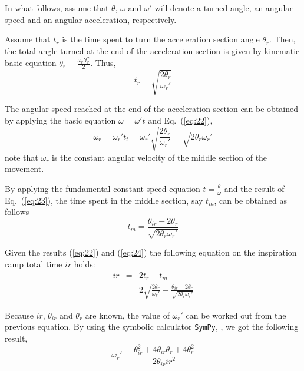 \documentclass[a4paper]{article}
\begin{document}
In what follows, assume that $\theta$, $\omega$ and $\omega'$ will
denote a turned angle, an angular speed and an angular acceleration,
respectively.




Assume that $t_r$ is the time spent to turn the acceleration section
angle $\theta_r$. Then, the total angle turned at the end of the
acceleration section is given by kinematic basic equation
$\theta_r=\frac{\omega_r' t_r^2}{2}$. Thus,
\begin{equation}
  \label{eq:22}
  t_r = \sqrt{\frac{2\theta_r}{\omega_r'}}
\end{equation}

The angular speed reached at the end of the acceleration section can
be obtained by applying the basic equation $\omega=\omega' t$ and
Eq.~(\ref{eq:22}),
\begin{equation}
  \label{eq:23}
  \boxed{
    \omega_r=\omega_r' t_t= \omega_r' \sqrt{\frac{2\theta_r}{\omega_r'}} = \sqrt{2\theta_r\omega_r'}
  }
\end{equation}
note that $\omega_r$ is the constant angular velocity of the middle
section of the movement.

By applying the fundamental constant speed equation
$t=\frac{\theta}{\omega}$ and the result of Eq.~(\ref{eq:23}), the time
spent in the middle section, say $t_m$, can be obtained as follows
\begin{equation}
  \label{eq:24}
  t_m = \frac{\theta_{ir}-2\theta_r}{\sqrt{2\theta_r\omega_r'}}
\end{equation}

Given the results (\ref{eq:22}) and (\ref{eq:24}) the following
equation on the inspiration ramp total time $\mathit{ir}$ holds:
\begin{eqnarray}
  \label{eq:1}
  ir &=& 2t_r + t_m \\
    &=& 2\sqrt{\frac{2\theta_r}{\omega_r'}} +
        \frac{\theta_{ir}-2\theta_r}{\sqrt{2\theta_r\omega_r'}}
\end{eqnarray}

Because $\mathit{ir}$, $\theta_{ir}$ and $\theta_r$ are known, the value of
$\omega_r'$ can be worked out from the previous equation. By using the
symbolic calculator \texttt{SymPy}, \cite{team20:_sympy}, we got the
following result,
\begin{equation}
  \label{eq:3}
  \boxed{
    \omega_r' = \frac{\theta_{ir}^2 + 4\theta_{ir}\theta_r + 4\theta_r^2}{2\theta_{ir} \mathit{ir}^2}
  }
\end{equation}
\end{document}
